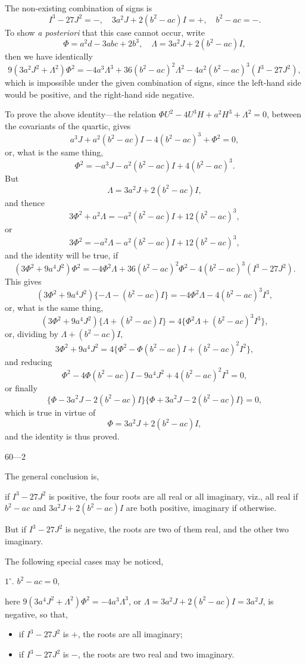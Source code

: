 \documentclass[11pt,a4paper]{article}
\theoremstyle{plain}
\begin{document}
The non-existing combination of signs is
\[
I^3 - 27J^2 = -,\quad 3a^2J + 2(b^2 - ac)I = +,\quad b^2 - ac = -.
\]
To show \textit{a posteriori} that this case cannot occur, write
\[
\Phi = a^2d - 3abc + 2b^3,\quad \Lambda = 3a^2J + 2(b^2 - ac)I,
\]
then we have identically
\[
9(3a^2J^2 + \Lambda^2)\Phi^2 = -4a^3\Lambda^3 + 36(b^2 - ac)^2\Lambda^2 - 4a^2(b^2 - ac)^3(I^3 - 27J^2),
\]
which is impossible under the given combination of signs, since the left-hand side would be positive, and the right-hand side negative.

To prove the above identity---the relation $\Phi U^2 - 4U^3H + a^2H^3 + \Lambda^2 = 0$, between the covariants of the quartic, gives
\[
a^3J + a^2(b^2 - ac)I - 4(b^2 - ac)^3 + \Phi^2 = 0,
\]
or, what is the same thing,
\[
\Phi^2 = -a^3J - a^2(b^2 - ac)I + 4(b^2 - ac)^3.
\]
But
\[
\Lambda = 3a^2J + 2(b^2 - ac)I,
\]
and thence
\[
3\Phi^2 + a^2\Lambda = -a^2(b^2 - ac)I + 12(b^2 - ac)^3,
\]
or
\[
3\Phi^2 = -a^2\Lambda - a^2(b^2 - ac)I + 12(b^2 - ac)^3,
\]
and the identity will be true, if
\[
(3\Phi^2 + 9a^4J^2)\Phi^2 = -4\Phi^2\Lambda + 36(b^2 - ac)^2\Phi^2 - 4(b^2 - ac)^3(I^3 - 27J^2).
\]
This gives
\[
(3\Phi^2 + 9a^4J^2)\{-\Lambda - (b^2 - ac)I\} = -4\Phi^2\Lambda - 4(b^2 - ac)^3I^3,
\]
or, what is the same thing,
\[
(3\Phi^2 + 9a^4J^2)\{\Lambda + (b^2 - ac)I\} = 4\{\Phi^2\Lambda + (b^2 - ac)^3I^3\},
\]
or, dividing by $\Lambda + (b^2 - ac)I$,
\[
3\Phi^2 + 9a^4J^2 = 4\{\Phi^2 - \Phi(b^2 - ac)I + (b^2 - ac)^2I^2\},
\]
and reducing
\[
\Phi^2 - 4\Phi(b^2 - ac)I - 9a^4J^2 + 4(b^2 - ac)^2I^3 = 0,
\]
or finally
\[
\{\Phi - 3a^2J - 2(b^2 - ac)I\}\{\Phi + 3a^2J - 2(b^2 - ac)I\} = 0,
\]
which is true in virtue of
\[
\Phi = 3a^2J + 2(b^2 - ac)I,
\]
and the identity is thus proved.

\hfill 60---2

The general conclusion is,

if $I^3 - 27J^2$ is positive, the four roots are all real or all imaginary, viz., all real if $b^2 - ac$ and $3a^2J + 2(b^2 - ac)I$ are both positive, imaginary if otherwise.

But if $I^3 - 27J^2$ is negative, the roots are two of them real, and the other two imaginary.

The following special cases may be noticed,

$1^\circ$. $b^2 - ac = 0$,

here $9(3a^4J^2 + \Lambda^2)\Phi^2 = -4a^3\Lambda^3$, or $\Lambda = 3a^2J + 2(b^2 - ac)I = 3a^2J$, is negative, so that,
\begin{itemize}
    \item if $I^3 - 27J^2$ is $+$, the roots are all imaginary;
    \item if $I^3 - 27J^2$ is $-$, the roots are two real and two imaginary.
\end{itemize}
\end{document}
